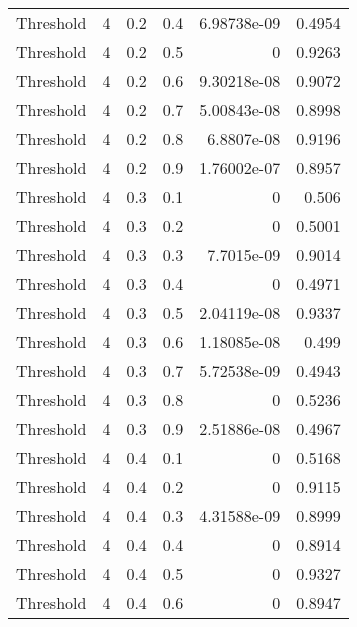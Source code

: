 \documentclass{article}
\begin{document}
\begin{longtable}[H]{lrrrrr}
 Threshold      &       4 &   0.2 &            0.4 &   6.98738e-09 &          0.4954 \\
 Threshold      &       4 &   0.2 &            0.5 &   0           &          0.9263 \\
 Threshold      &       4 &   0.2 &            0.6 &   9.30218e-08 &          0.9072 \\
 Threshold      &       4 &   0.2 &            0.7 &   5.00843e-08 &          0.8998 \\
 Threshold      &       4 &   0.2 &            0.8 &   6.8807e-08  &          0.9196 \\
 Threshold      &       4 &   0.2 &            0.9 &   1.76002e-07 &          0.8957 \\
 Threshold      &       4 &   0.3 &            0.1 &   0           &          0.506  \\
 Threshold      &       4 &   0.3 &            0.2 &   0           &          0.5001 \\
 Threshold      &       4 &   0.3 &            0.3 &   7.7015e-09  &          0.9014 \\
 Threshold      &       4 &   0.3 &            0.4 &   0           &          0.4971 \\
 Threshold      &       4 &   0.3 &            0.5 &   2.04119e-08 &          0.9337 \\
 Threshold      &       4 &   0.3 &            0.6 &   1.18085e-08 &          0.499  \\
 Threshold      &       4 &   0.3 &            0.7 &   5.72538e-09 &          0.4943 \\
 Threshold      &       4 &   0.3 &            0.8 &   0           &          0.5236 \\
 Threshold      &       4 &   0.3 &            0.9 &   2.51886e-08 &          0.4967 \\
 Threshold      &       4 &   0.4 &            0.1 &   0           &          0.5168 \\
 Threshold      &       4 &   0.4 &            0.2 &   0           &          0.9115 \\
 Threshold      &       4 &   0.4 &            0.3 &   4.31588e-09 &          0.8999 \\
 Threshold      &       4 &   0.4 &            0.4 &   0           &          0.8914 \\
 Threshold      &       4 &   0.4 &            0.5 &   0           &          0.9327 \\
 Threshold      &       4 &   0.4 &            0.6 &   0           &          0.8947 \\

\end{longtable}
\end{document}
